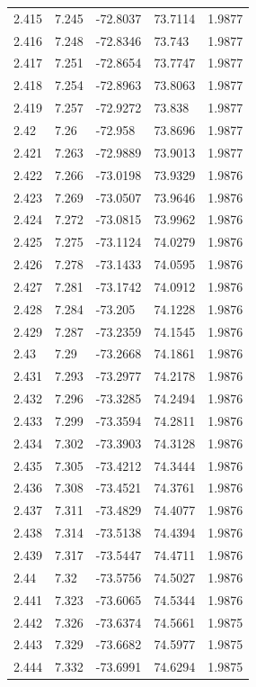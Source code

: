 \begin{tabular}{lllll}
2.415 & 7.245 & -72.8037 & 73.7114 & 1.9877 \\
2.416 & 7.248 & -72.8346 & 73.743 & 1.9877 \\
2.417 & 7.251 & -72.8654 & 73.7747 & 1.9877 \\
2.418 & 7.254 & -72.8963 & 73.8063 & 1.9877 \\
2.419 & 7.257 & -72.9272 & 73.838 & 1.9877 \\
2.42 & 7.26 & -72.958 & 73.8696 & 1.9877 \\
2.421 & 7.263 & -72.9889 & 73.9013 & 1.9877 \\
2.422 & 7.266 & -73.0198 & 73.9329 & 1.9876 \\
2.423 & 7.269 & -73.0507 & 73.9646 & 1.9876 \\
2.424 & 7.272 & -73.0815 & 73.9962 & 1.9876 \\
2.425 & 7.275 & -73.1124 & 74.0279 & 1.9876 \\
2.426 & 7.278 & -73.1433 & 74.0595 & 1.9876 \\
2.427 & 7.281 & -73.1742 & 74.0912 & 1.9876 \\
2.428 & 7.284 & -73.205 & 74.1228 & 1.9876 \\
2.429 & 7.287 & -73.2359 & 74.1545 & 1.9876 \\
2.43 & 7.29 & -73.2668 & 74.1861 & 1.9876 \\
2.431 & 7.293 & -73.2977 & 74.2178 & 1.9876 \\
2.432 & 7.296 & -73.3285 & 74.2494 & 1.9876 \\
2.433 & 7.299 & -73.3594 & 74.2811 & 1.9876 \\
2.434 & 7.302 & -73.3903 & 74.3128 & 1.9876 \\
2.435 & 7.305 & -73.4212 & 74.3444 & 1.9876 \\
2.436 & 7.308 & -73.4521 & 74.3761 & 1.9876 \\
2.437 & 7.311 & -73.4829 & 74.4077 & 1.9876 \\
2.438 & 7.314 & -73.5138 & 74.4394 & 1.9876 \\
2.439 & 7.317 & -73.5447 & 74.4711 & 1.9876 \\
2.44 & 7.32 & -73.5756 & 74.5027 & 1.9876 \\
2.441 & 7.323 & -73.6065 & 74.5344 & 1.9876 \\
2.442 & 7.326 & -73.6374 & 74.5661 & 1.9875 \\
2.443 & 7.329 & -73.6682 & 74.5977 & 1.9875 \\
2.444 & 7.332 & -73.6991 & 74.6294 & 1.9875 \\

\end{tabular}

